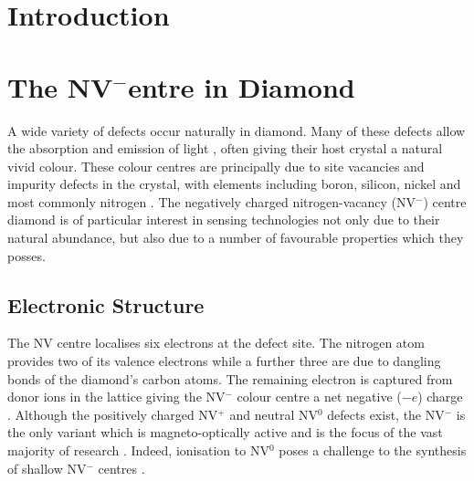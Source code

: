 \documentclass[12pt]{article}
\begin{document}
\tableofcontents
\section{Introduction}
\section{The NV\texorpdfstring{$^-$} Centre in Diamond}
A wide variety of defects occur naturally in diamond. Many of these defects allow the absorption and emission of light \cite{zaitsev2001optical}, often giving their host crystal a natural vivid colour. These colour centres are principally due to site vacancies and impurity defects in the crystal, with elements including boron, silicon, nickel and most commonly nitrogen \cite{wu2016diamond}. The negatively charged nitrogen-vacancy (NV$^-$) centre diamond is of particular interest in sensing technologies not only due to their natural abundance, but also due to a number of favourable properties which they posses. 

\subsection{Electronic Structure}
The NV centre localises six electrons at the defect site. The nitrogen atom provides two of its valence electrons while a further three are due to dangling bonds of the diamond's carbon atoms\cite{schirhagl2014nitrogen}. The remaining electron is captured from donor ions in the lattice giving the NV$^-$ colour centre a net negative ($-e$) charge \cite{schirhagl2014nitrogen}. Although the positively charged NV$^+$ and neutral NV$^0$ defects exist, the NV$^-$ is the only variant which is magneto-optically active and is the focus of the vast majority of research \cite{schirhagl2014nitrogen}. Indeed, ionisation to NV$^0$ poses a challenge to the synthesis of shallow NV$^-$ centres \cite{hauf2011chemical}. 
\end{document}
